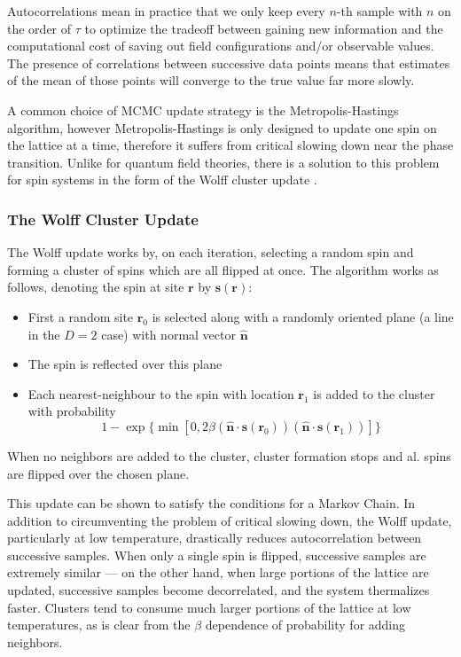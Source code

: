 \documentclass[12pt]{article}
\begin{document}
Autocorrelations mean in practice that we only keep every $n$-th sample with $n$ on the order of $\tau$ to optimize the tradeoff between gaining new information and the computational cost
of saving out field configurations and/or observable values. The presence of correlations between successive data points means that estimates of the mean of those points
will converge to the true value far more slowly.

A common choice of MCMC update strategy is the Metropolis-Hastings algorithm, however Metropolis-Hastings is only designed to update one spin on the lattice at a time, therefore
it suffers from critical slowing down near the phase transition. Unlike for quantum field theories, there is a solution to this problem for spin systems in the form
of the Wolff cluster update \cite{PhysRevLett.62.361}.

\subsubsection{The Wolff Cluster Update}

The Wolff update works by, on each iteration, selecting a random spin and forming a cluster of spins which are all flipped at once. The algorithm works as follows,
denoting the spin at site $\mathbf{r}$ by $\mathbf{s}(\mathbf{r})$:

\begin{itemize}
	\item First a random site $\mathbf{r}_0$ is selected along with a randomly oriented plane (a line in the $D=2$ case) with normal vector $\mathbf{\hat{n}}$
	\item The spin is reflected over this plane
	\item Each nearest-neighbour to the spin with location $\mathbf{r}_1$ is added to the cluster with probability \[
		      1-\exp\{\min[0,2\beta(\mathbf{\hat{n}} \cdot \mathbf{s}(\mathbf{r}_0))(\mathbf{\hat{n}} \cdot \mathbf{s}(\mathbf{r}_1))]\}
	      \]
\end{itemize}

When no neighbors are added to the cluster, cluster formation stops and al. spins are flipped over the chosen plane.

This update can be shown to satisfy the conditions for a Markov Chain. In addition to circumventing the problem of critical slowing down, the Wolff update, particularly
at low temperature, drastically reduces autocorrelation between successive samples. When only a single spin is flipped, successive samples are extremely similar --- on the other hand, when large portions of the lattice are updated, successive samples become decorrelated, and the
system thermalizes faster. Clusters tend to consume much larger portions of the lattice at low temperatures, as is clear from the $\beta$ dependence of probability for 
adding neighbors.
\end{document}
